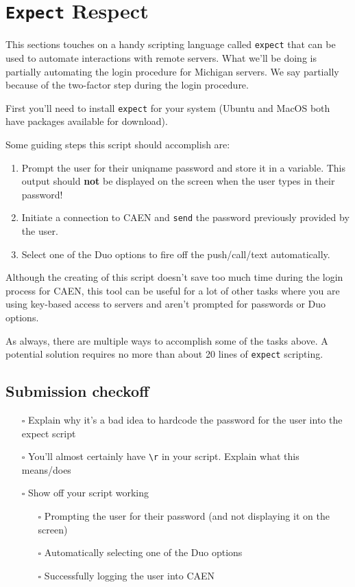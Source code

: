 \documentclass{article}
\begin{document}
\section*{\texttt{Expect} Respect}

This sections touches on a handy scripting language called \texttt{expect} that
can be used to automate interactions with remote servers. What we'll be doing is
partially automating the login procedure for Michigan servers. We say partially
because of the two-factor step during the login procedure.

First you'll need to install \texttt{expect} for your system (Ubuntu and MacOS
both have packages available for download).

Some guiding steps this script should accomplish are:

\begin{enumerate}
    \item
        Prompt the user for their uniqname password and store
        it in a variable. This output should \textbf{not} be displayed on the screen when
        the user types in their password!
    \item
        Initiate a connection to CAEN and \texttt{send} the password previously
        provided by the user.
    \item
        Select one of the Duo options to fire off the push/call/text
        automatically.
\end{enumerate}

Although the creating of this script doesn't save too much time during the login
process for CAEN, this tool can be useful for a lot of other
tasks where you are using key-based access to servers and aren't prompted for
passwords or Duo options.

As always, there are multiple ways to accomplish some of the tasks above. A
potential solution requires no more than about 20 lines of \texttt{expect}
scripting.

\subsection*{Submission checkoff}
\begin{itemize}
  \item[$\square$] Explain why it's a bad idea to hardcode the password for the
      user into the expect script
  \item[$\square$] You'll almost certainly have \texttt{\textbackslash r} in your script. Explain
      what this means/does
  \item[$\square$] Show off your script working
    \begin{itemize}
        \item[$\square$] Prompting the user for their password (and not
            displaying it on the screen)
      \item[$\square$] Automatically selecting one of the Duo options
      \item[$\square$] Successfully logging the user into CAEN
    \end{itemize}
\end{itemize}
\end{document}
